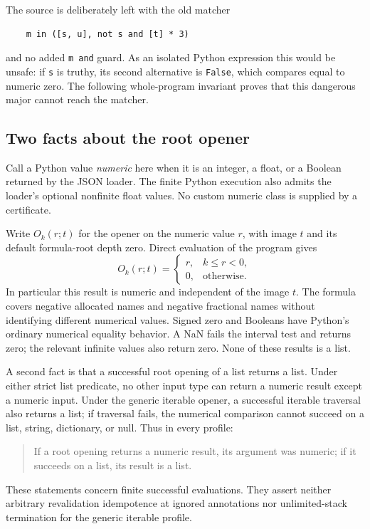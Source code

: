 \documentclass[11pt]{article}
\theoremstyle{definition}\newtheorem{definition}[theorem]{Definition}
\begin{document}
The source is deliberately left with the old matcher
\begin{verbatim}
    m in ([s, u], not s and [t] * 3)
\end{verbatim}
and no added \texttt{m and} guard.  As an isolated Python expression this
would be unsafe: if \texttt{s} is truthy, its second alternative is
\texttt{False}, which compares equal to numeric zero.  The following
whole-program invariant proves that this dangerous major cannot reach
the matcher.

\subsection{Two facts about the root opener}

Call a Python value \emph{numeric} here when it is an integer, a float,
or a Boolean returned by the JSON loader.  The finite Python execution
also admits the loader's optional nonfinite float values.  No custom
numeric class is supplied by a certificate.

Write $O_k(r;t)$ for the opener on the numeric value $r$, with image $t$
and its default formula-root depth zero.  Direct evaluation of the
program gives
\[
 O_k(r;t)=
 \begin{cases}
 r,&k\le r<0,\\
 0,&\text{otherwise}.
 \end{cases}
 \tag{Root scalar}
\]
In particular this result is numeric and independent of the image $t$.
The formula covers negative allocated names and negative fractional
names without identifying different numerical values.  Signed zero and
Booleans have Python's ordinary numerical equality behavior.  A NaN
fails the interval test and returns zero; the relevant infinite values
also return zero.  None of these results is a list.

A second fact is that a successful root opening of a list returns a
list.  Under either strict list predicate, no other input type can
return a numeric result except a numeric input.  Under the generic
iterable opener, a successful iterable traversal also returns a list;
if traversal fails, the numerical comparison cannot succeed on a list,
string, dictionary, or null.  Thus in every profile:
\begin{quote}
If a root opening returns a numeric result, its argument was numeric;
if it succeeds on a list, its result is a list.
\end{quote}
These statements concern finite successful evaluations.  They assert
neither arbitrary revalidation idempotence at ignored annotations nor
unlimited-stack termination for the generic iterable profile.
\end{document}
